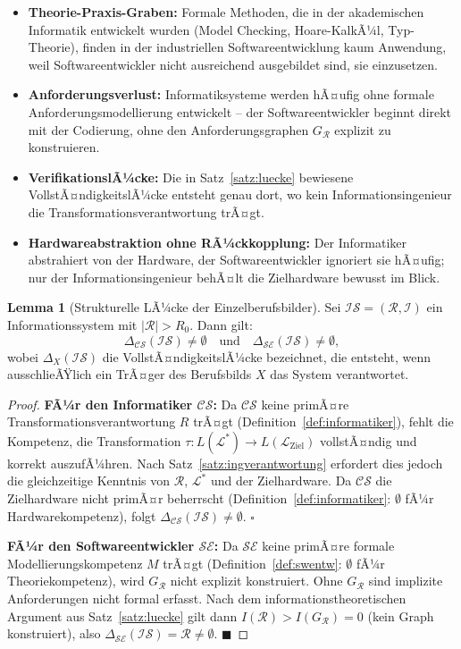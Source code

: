 ﻿\documentclass[a4paper,12pt]{article}
\theoremstyle{definition}
\newtheorem{lemma}{Lemma}
\begin{document}
\begin{itemize}
  \item \textbf{Theorie-Praxis-Graben:} Formale Methoden, die in der akademischen
        Informatik entwickelt wurden (Model Checking, Hoare-KalkÃ¼l, Typ-Theorie),
        finden in der industriellen Softwareentwicklung kaum Anwendung,
        weil Softwareentwickler nicht ausreichend ausgebildet sind, sie einzusetzen.
  \item \textbf{Anforderungsverlust:} Informatiksysteme werden hÃ¤ufig ohne
        formale Anforderungsmodellierung entwickelt -- der Softwareentwickler
        beginnt direkt mit der Codierung, ohne den Anforderungsgraphen
        $G_\mathcal{R}$ explizit zu konstruieren.
  \item \textbf{VerifikationslÃ¼cke:} Die in Satz~\ref{satz:luecke} bewiesene
        VollstÃ¤ndigkeitslÃ¼cke entsteht genau dort, wo kein Informationsingenieur
        die Transformationsverantwortung trÃ¤gt.
  \item \textbf{Hardwareabstraktion ohne RÃ¼ckkopplung:} Der Informatiker abstrahiert
        von der Hardware, der Softwareentwickler ignoriert sie hÃ¤ufig; nur der
        Informationsingenieur behÃ¤lt die Zielhardware bewusst im Blick.
\end{itemize}

\begin{lemma}[Strukturelle LÃ¼cke der Einzelberufsbilder]
\label{lem:luecke_berufe}
Sei $\mathcal{IS} = (\mathcal{R}, \mathcal{I})$ ein Informationssystem mit
$|\mathcal{R}| > R_0$. Dann gilt:
\[
  \Delta_{\mathcal{CS}}(\mathcal{IS}) \neq \emptyset
  \quad \text{und} \quad
  \Delta_{\mathcal{SE}}(\mathcal{IS}) \neq \emptyset,
\]
wobei $\Delta_X(\mathcal{IS})$ die VollstÃ¤ndigkeitslÃ¼cke bezeichnet, die entsteht,
wenn ausschlieÃŸlich ein TrÃ¤ger des Berufsbilds $X$ das System verantwortet.
\end{lemma}

\begin{proof}
\textbf{FÃ¼r den Informatiker $\mathcal{CS}$:}
Da $\mathcal{CS}$ keine primÃ¤re Transformationsverantwortung $R$ trÃ¤gt
(Definition~\ref{def:informatiker}), fehlt die Kompetenz, die Transformation
$\tau: L(\mathcal{L}^*) \to L(\mathcal{L}_{\text{Ziel}})$ vollstÃ¤ndig und korrekt
auszufÃ¼hren. Nach Satz~\ref{satz:ingverantwortung} erfordert dies jedoch die
gleichzeitige Kenntnis von $\mathcal{R}$, $\mathcal{L}^*$ und der Zielhardware.
Da $\mathcal{CS}$ die Zielhardware nicht primÃ¤r beherrscht
(Definition~\ref{def:informatiker}: $\emptyset$ fÃ¼r Hardwarekompetenz), folgt
$\Delta_{\mathcal{CS}}(\mathcal{IS}) \neq \emptyset$. $\square$

\textbf{FÃ¼r den Softwareentwickler $\mathcal{SE}$:}
Da $\mathcal{SE}$ keine primÃ¤re formale Modellierungskompetenz $M$ trÃ¤gt
(Definition~\ref{def:swentw}: $\emptyset$ fÃ¼r Theoriekompetenz), wird
$G_\mathcal{R}$ nicht explizit konstruiert. Ohne $G_\mathcal{R}$ sind
implizite Anforderungen nicht formal erfasst. Nach dem informationstheoretischen
Argument aus Satz~\ref{satz:luecke} gilt dann
$I(\mathcal{R}) > I(G_\mathcal{R}) = 0$ (kein Graph konstruiert), also
$\Delta_{\mathcal{SE}}(\mathcal{IS}) = \mathcal{R} \neq \emptyset$. $\blacksquare$
\end{proof}
\end{document}
